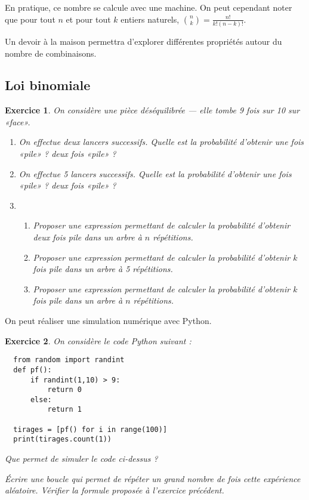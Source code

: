 \documentclass[a4ppaer,12pt,french]{article}
\newtheorem{exercice}{Exercice}
\begin{document}
En pratique, ce nombre se calcule avec une machine. On peut cependant
noter que pour tout $n$ et pour tout $k$ entiers naturels,
$\binom{n}{k} = \frac{n!}{k!(n-k)!}$.

Un devoir à la maison permettra d'explorer différentes propriétés autour
du nombre de combinaisons.

\subsection{Loi binomiale}

\begin{mdframed}
  \begin{exercice}
    On considère une pièce déséquilibrée --- elle tombe 9 fois sur 10
    sur «face».
    \begin{enumerate}
      \item On effectue deux lancers successifs. Quelle est la
        probabilité d'obtenir une fois «pile» ? deux fois «pile»
        ?\\[2.4cm]
      \item On effectue 5 lancers successifs. Quelle est la probabilité
        d'obtenir une fois «pile» ? deux fois «pile» ?\\[3.2cm]
      \item \begin{enumerate}
          \item Proposer une expression permettant de calculer la
            probabilité d'obtenir deux fois pile dans un arbre à $n$
            répétitions.\\[1.6cm]
          \item Proposer une expression permettant de calculer la
            probabilité d'obtenir $k$ fois pile dans un arbre à 5
            répétitions.\\[1.6cm]
          \item Proposer une expression permettant de calculer la
            probabilité d'obtenir $k$ fois pile dans un arbre à $n$
            répétitions.\\[1.6cm]
      \end{enumerate}
    \end{enumerate}
  \end{exercice}
\end{mdframed}

On peut réaliser une simulation numérique avec Python.

\begin{exercice}
  On considère le code Python suivant :
  \begin{verbatim}
  from random import randint
  def pf():
      if randint(1,10) > 9:
          return 0
      else:
          return 1

  tirages = [pf() for i in range(100)]
  print(tirages.count(1))
  \end{verbatim}

  Que permet de simuler le code ci-dessus ?

  \vspace{1.6cm}
  Écrire une boucle qui permet de répéter un grand nombre de fois cette
  expérience aléatoire. Vérifier la formule proposée à l'exercice
  précédent.
\end{exercice}
\end{document}
